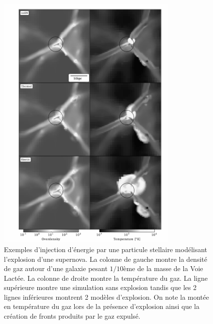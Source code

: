 \begin{figure}[htbp]
	\centering
		\includegraphics[height=13cm]{figs/SN.png}
	\caption[Exemples d'injection d'énergie par une particule stellaire modélisant l'explosion d'une supernova. ]{Exemples d'injection d'énergie par une particule stellaire modélisant l'explosion d'une supernova. La colonne de gauche montre la densité de gaz autour d'une galaxie pesant $1/10$ème de la masse de la Voie Lactée. La colonne de droite montre la température du gaz. La ligne supérieure montre une simulation sans explosion tandis que les 2 lignes inférieures montrent 2 modèles d'explosion. On note la montée en température du gaz lors de la présence d'explosion ainsi que la création de fronts produits par le gaz expulsé.}
	\label{f:SN}
\end{figure}

